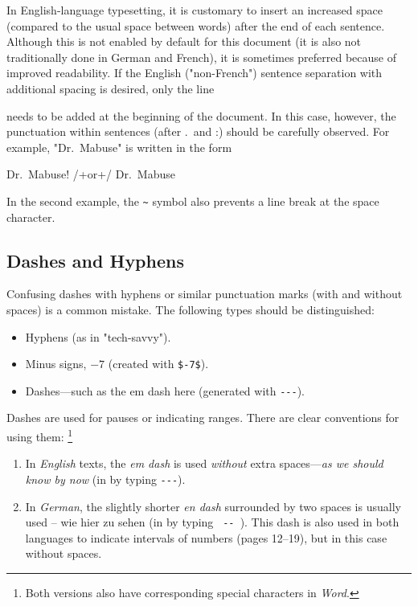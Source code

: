 In English-language typesetting, it is customary to insert an increased space
(compared to the usual space between words) after the end of each sentence.
Although this is not enabled by default for this document (it is also not
traditionally done in German and French), it is sometimes preferred because of
improved readability. If the English ("non-French") sentence separation with
additional spacing is desired, only the line
%
\begin{LaTeXCode}[numbers=none]
\nonfrenchspacing
\end{LaTeXCode}
%
needs to be added at the beginning of the document. In this case, however, the
punctuation within sentences (after .\ and :) should be carefully observed. For
example, "Dr.\ Mabuse" is written in the form
%
\begin{LaTeXCode}[numbers=none]
Dr.\ Mabuse! /+\quad\textrm{or}\quad+/ Dr.~Mabuse
\end{LaTeXCode}
%
In the second example, the \verb!~! symbol also prevents a line break at the
space character.

\subsection{Dashes and Hyphens}
\label{sec:dash}

Confusing dashes with hyphens or similar punctuation marks (with and without
spaces) is a common mistake. The following types should be distinguished:
%
\begin{itemize}
    \item Hyphens (as in "tech-savvy").
    \item Minus signs, \eg $-7$ (created with \verb!$-7$!).
    \item Dashes---such as the em dash here (generated with \verb!---!).
\end{itemize}
%
\noindent
Dashes are used for pauses or indicating ranges. There are clear conventions
for using them:%
\footnote{Both versions also have corresponding special characters in
\emph{Word}.}
%
\begin{enumerate}
	\item In \emph{English} texts, the \emph{em dash} is used \emph{without}
	extra spaces---\emph{as we should know by now} (in \latex by typing
	{\verb*!---!}).
	\item In \emph{German}, the slightly shorter \emph{en dash} surrounded by
	two spaces is usually used -- wie hier zu sehen (in \latex by typing
	{\verb*! -- !}). This dash is also used in both languages to indicate
	intervals of numbers (pages 12--19), but in this case without spaces.
\end{enumerate}

